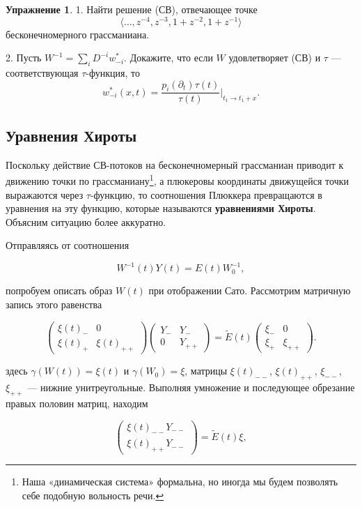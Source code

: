 \documentclass{article}
\theoremstyle{definition}
\theoremstyle{definition} %
\theoremstyle{remark}     %
\theoremstyle{definition}
\theoremstyle{definition}
\theoremstyle{definition}
\theoremstyle{definition}
\theoremstyle{definition}
\theoremstyle{definition}
\theoremstyle{definition}
\theoremstyle{definition}
\newtheorem{exercise}{Упражнение}[section]
\begin{document}
\begin{exercise}
  1. Найти решение (СВ), отвечающее точке
  \[
    \langle \dots, z^{-4}, z^{-3}, 1 + z^{-2}, 1 + z^{-1} \rangle
  \]
  бесконечномерного грассманиана.

  2. Пусть \(W^{-1} = \sum_i D^{-i} w_{-i}^*\). Докажите, что если \(W\) удовлетворяет (СВ) и \(\tau\) — соответствующая \(\tau\)-функция, то
  \[
    w_{-i}^*(x, t) = \frac{p_i(\partial_t)\tau(t)}{\tau(t)} \bigg|_{t_1 \to t_1+x}.
  \]
\end{exercise}





\subsection{Уравнения Хироты}
Поскольку действие СВ-потоков на бесконечномерный грассманиан приводит к движению точки по грассманиану\footnote{Наша «динамическая система» формальна, но иногда мы будем позволять себе подобную вольность речи.}, а плюкеровы координаты движущейся точки выражаются через \(\tau\)-функцию, то соотношения Плюккера превращаются в уравнения на эту функцию, которые называются \textbf{уравнениями Хироты}. Объясним ситуацию более аккуратно.

Отправляясь от соотношения

\[
W^{-1}(t)Y(t) = E(t)W_0^{-1},
\]

попробуем описать образ \(W(t)\) при отображении Сато. Рассмотрим матричную запись этого равенства

\[
\begin{pmatrix}
\xi(t)_- & 0 \\
\xi(t)_+ & \xi(t)_{++}
\end{pmatrix}
\begin{pmatrix}
Y_- & Y_- \\
0 & Y_{++}
\end{pmatrix}
=
\tilde{E}(t)
\begin{pmatrix}
\xi_- & 0 \\
\xi_+ & \xi_{++}
\end{pmatrix}.
\]

здесь \(\gamma(W(t)) = \xi(t)\) и \(\gamma(W_0) = \xi\), матрицы \(\xi(t)_{--}\), \(\xi(t)_{++}\), \(\xi_{--}\), \(\xi_{++}\) — нижние унитреугольные. Выполняя умножение и последующее обрезание правых половин матриц, находим

\[
\begin{pmatrix}
\xi(t)_{--} Y_{--} \\
\xi(t)_{++} Y_{--}
\end{pmatrix}
= \tilde{E}(t)\xi,
\]
\end{document}
